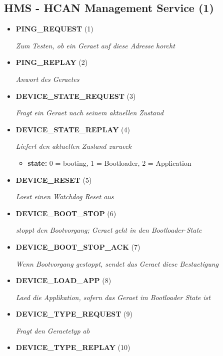 
\subsection{HMS - HCAN Management Service (1)}
\begin{itemize}
		
\item \textbf{PING\_REQUEST} (1)

\textit{Zum Testen, ob ein Geraet auf diese Adresse horcht}

\item \textbf{PING\_REPLAY} (2)

\textit{Anwort des Geraetes}

\item \textbf{DEVICE\_STATE\_REQUEST} (3)

\textit{Fragt ein Geraet nach seinem aktuellen Zustand}

\item \textbf{DEVICE\_STATE\_REPLAY} (4)

\textit{Liefert den aktuellen Zustand zurueck}

\small
\begin{itemize}
		
\item \textbf{state:} 0 = booting, 1 = Bootloader, 2 = Application
\end{itemize}
\normalsize
	
\item \textbf{DEVICE\_RESET} (5)

\textit{Loest einen Watchdog Reset aus}

\item \textbf{DEVICE\_BOOT\_STOP} (6)

\textit{stoppt den Bootvorgang; Geraet geht in den Bootloader-State}

\item \textbf{DEVICE\_BOOT\_STOP\_ACK} (7)

\textit{Wenn Bootvorgang gestoppt, sendet das Geraet diese Bestaetigung}

\item \textbf{DEVICE\_LOAD\_APP} (8)

\textit{Laed die Applikation, sofern das Geraet im Bootloader State ist}

\item \textbf{DEVICE\_TYPE\_REQUEST} (9)

\textit{Fragt den Geraetetyp ab}

\item \textbf{DEVICE\_TYPE\_REPLAY} (10)


\end{itemize}
